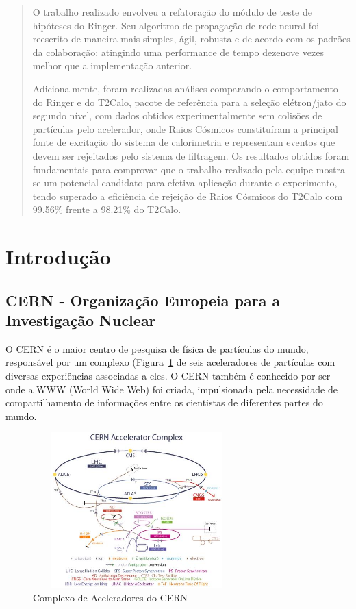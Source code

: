 \documentclass[a4paper,10pt,titlepage]{article}
\begin{document}
\begin{abstract}
O trabalho realizado envolveu a refatoração do módulo de teste de hipóteses do Ringer.
Seu algoritmo de propagação de rede neural foi reescrito de maneira mais simples, ágil, robusta e de acordo com os padrões da colaboração; atingindo uma performance de tempo dezenove vezes melhor que a implementação anterior.

Adicionalmente, foram realizadas análises comparando o comportamento do Ringer e do T2Calo, pacote de referência para a seleção elétron/jato do segundo nível, com dados obtidos experimentalmente sem colisões de partículas pelo acelerador, onde Raios Cósmicos constituíram a principal fonte de excitação do sistema de calorimetria e representam eventos que devem ser rejeitados pelo sistema de filtragem.
Os resultados obtidos foram fundamentais para comprovar que o trabalho realizado pela equipe mostra-se um potencial candidato para efetiva aplicação durante o experimento, tendo superado a eficiência de rejeição de Raios Cósmicos do T2Calo com 99.56\% frente a 98.21\% do T2Calo.

\end{abstract}

\section{Introdução}

\subsection{CERN - Organização Europeia para a Investigação Nuclear}

O CERN é o maior centro de pesquisa de física de partículas do mundo, responsável por um complexo (Figura~\ref{fig:cern_acelerators} de seis aceleradores de partículas com diversas experiências associadas a eles.
O CERN também é conhecido por ser onde a WWW (World Wide Web) foi criada, impulsionada pela necessidade de compartilhamento de informações entre os cientistas de diferentes partes do mundo.

\begin{figure}[htbp!]
 \centering
 \includegraphics[width=8cm,height=6cm]{Figs/atlas/cern_acelerators.jpeg}
 \caption{Complexo de Aceleradores do CERN}
 \label{fig:cern_acelerators}
\end{figure}
\end{document}
